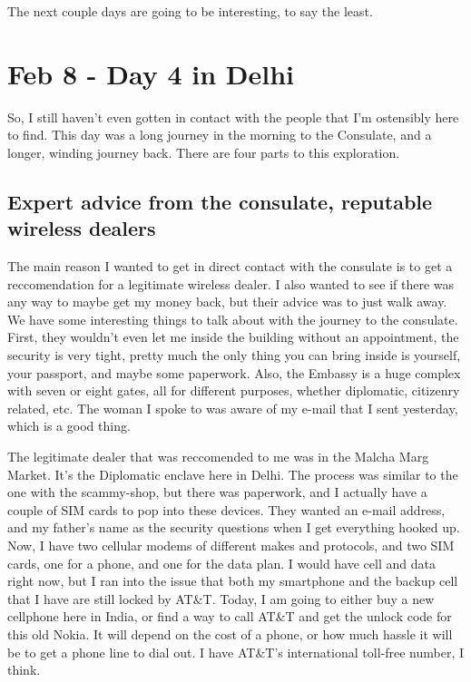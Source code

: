 \documentclass[11pt]{amsart}
\begin{document}
The next couple days are going to be interesting, to say the least.

\section{Feb 8 - Day 4 in Delhi}

So, I still haven't even gotten in contact with the people that I'm ostensibly here to find. This day was a long journey in the morning to the Consulate, and a longer, winding journey back. There are four parts to this exploration.

\subsection{Expert advice from the consulate, reputable wireless dealers} 

The main reason I wanted to get in direct contact with the consulate is to get a reccomendation for a legitimate wireless dealer. I also wanted to see if there was any way to maybe get my money back, but their advice was to just walk away. We have some interesting things to talk about with the journey to the consulate. First, they wouldn't even let me inside the building without an appointment, the security is very tight, pretty much the only thing you can bring inside is yourself, your passport, and maybe some paperwork.  Also, the Embassy is a huge complex with seven or eight gates, all for different purposes, whether diplomatic, citizenry related, etc. The woman I spoke to was aware of my e-mail that I sent yesterday, which is a good thing.

The legitimate dealer that was reccomended to me was in the Malcha Marg Market. It's the Diplomatic enclave here in Delhi. The process was similar to the one with the scammy-shop, but there was paperwork, and I actually have a couple of SIM cards to pop into these devices. They wanted an e-mail address, and my father's name as the security questions when I get everything hooked up. Now, I have two cellular modems of different makes and protocols, and two SIM cards, one for a phone, and one for the data plan. I would have cell and data right now, but I ran into the issue that both my smartphone and the backup cell that I have are still locked by AT\&T. Today, I am going to either buy a new cellphone here in India, or find a way to call AT\&T and get the unlock code for this old Nokia. It will depend on the cost of a phone, or how much hassle it will be to get a phone line to dial out. I have AT\&T's international toll-free number, I think.
\end{document}
